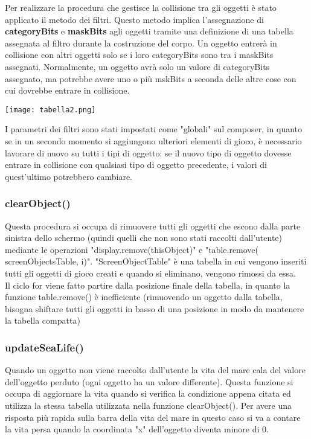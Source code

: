 \documentclass[12pt]{article}
\begin{document}
Per realizzare la procedura che gestisce la collisione tra gli oggetti è stato applicato il metodo dei filtri. 
Questo metodo implica l'assegnazione di \textbf{categoryBits} e \textbf{maskBits} agli oggetti tramite una definizione di una 
tabella assegnata al filtro durante la costruzione del corpo. Un oggetto entrerà in collisione con altri oggetti solo se i loro 
categoryBits sono tra i maskBits assegnati. Normalmente, un oggetto avrà solo un valore di categoryBits assegnato, ma potrebbe avere 
uno o più mskBits a seconda delle altre cose con cui dovrebbe entrare in collisione.

\begin{center}
    \texttt{[image: tabella2.png]}\\
\end{center}

I parametri dei filtri sono stati impostati come "globali" sul composer, in quanto se in un secondo momento si aggiungono ulteriori 
elementi di gioco, è necessario lavorare di nuovo su tutti i tipi di oggetto: se il nuovo tipo di oggetto dovesse entrare in 
collisione con qualsiasi tipo di oggetto precedente, i valori di quest'ultimo potrebbero cambiare. 

\subsubsection{clearObject()}
Questa procedura si occupa di rimuovere tutti gli oggetti che escono dalla parte sinistra dello schermo (quindi quelli che non sono stati raccolti dall'utente) mediante le operazioni "display.remove(thisObject)" e "table.remove( screenObjectsTable, i)". "ScreenObjectTable" è una tabella in cui vengono inseriti tutti gli oggetti di gioco creati e quando si eliminano, vengono rimossi da essa. \\
Il ciclo for viene fatto partire dalla posizione finale della tabella, in quanto la funzione table.remove() è inefficiente (rimuovendo un oggetto dalla tabella, bisogna shiftare tutti gli oggetti in basso di una posizione in modo da mantenere la tabella compatta)

\subsubsection{updateSeaLife()}
Quando un oggetto non viene raccolto dall'utente la vita del mare cala del valore dell'oggetto perduto (ogni oggetto ha un valore differente). Questa funzione si occupa di aggiornare la vita quando si verifica la condizione appena citata ed utilizza la stessa tabella utilizzata nella funzione clearObject().
Per avere una risposta più rapida sulla barra della vita del mare in questo caso si va a contare la vita persa quando la coordinata "x" dell'oggetto diventa minore di 0.
\end{document}
